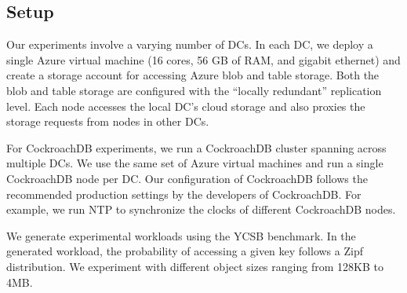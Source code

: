 \subsection{Setup}
Our experiments involve a varying number of DCs. In each DC, we deploy a single
Azure virtual machine (16 cores, 56 GB of RAM, and gigabit ethernet) and create
a storage account for accessing Azure blob and table storage. Both the blob and
table storage are configured with the ``locally redundant'' replication level.
Each \name node accesses the local DC's cloud storage and also proxies the
storage requests from \name nodes in other DCs.  

For CockroachDB experiments, we run a CockroachDB cluster spanning across
multiple DCs.  We use the same set of Azure virtual machines and run a single
CockroachDB node per DC. Our configuration of CockroachDB follows the
recommended production settings by the developers of CockroachDB. For example,
we run NTP to synchronize the clocks of different CockroachDB nodes. 

We generate experimental workloads using the YCSB benchmark. In the generated
workload, the probability of accessing a given key follows a Zipf distribution.
We experiment with different object sizes ranging from 128KB to 4MB. 
